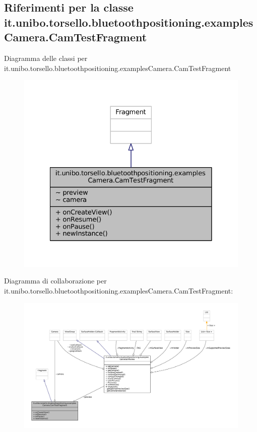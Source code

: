 \hypertarget{classit_1_1unibo_1_1torsello_1_1bluetoothpositioning_1_1examplesCamera_1_1CamTestFragment}{}\subsection{Riferimenti per la classe it.\+unibo.\+torsello.\+bluetoothpositioning.\+examples\+Camera.\+Cam\+Test\+Fragment}
\label{classit_1_1unibo_1_1torsello_1_1bluetoothpositioning_1_1examplesCamera_1_1CamTestFragment}


Diagramma delle classi per it.\+unibo.\+torsello.\+bluetoothpositioning.\+examples\+Camera.\+Cam\+Test\+Fragment
\nopagebreak
\begin{figure}[H]
\begin{center}
\leavevmode
\includegraphics[width=328pt]{classit_1_1unibo_1_1torsello_1_1bluetoothpositioning_1_1examplesCamera_1_1CamTestFragment__inherit__graph}
\end{center}
\end{figure}


Diagramma di collaborazione per it.\+unibo.\+torsello.\+bluetoothpositioning.\+examples\+Camera.\+Cam\+Test\+Fragment\+:
\nopagebreak
\begin{figure}[H]
\begin{center}
\leavevmode
\includegraphics[width=350pt]{classit_1_1unibo_1_1torsello_1_1bluetoothpositioning_1_1examplesCamera_1_1CamTestFragment__coll__graph}
\end{center}
\end{figure}
